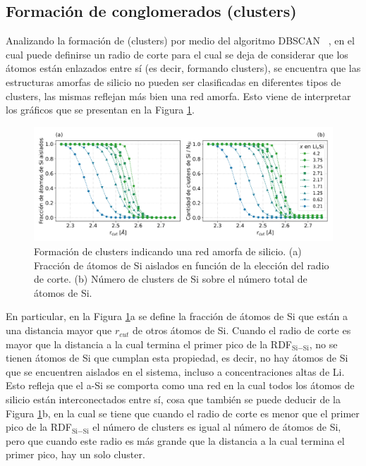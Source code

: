 \subsection{Formación de conglomerados (clusters)}\label{s:clusters}

Analizando la formación de  (clusters) por medio del algoritmo DBSCAN 
~\cite{ester1996}, en el cual puede definirse un radio de corte para el cual se 
deja de considerar que los átomos están enlazados entre sí (es decir, formando 
clusters), se encuentra que las estructuras amorfas de silicio no pueden ser 
clasificadas en diferentes tipos de clusters, las mismas reflejan más bien 
una red amorfa. Esto viene de interpretar los gráficos que se presentan en la 
Figura \ref{fig:clusters}. 
\begin{figure}[h!]
    \centering
    \includegraphics[width=\textwidth]{Silicio/caracterizacion/resultados/clusters/clusters.png}
    \caption{Formación de clusters indicando una red amorfa de silicio. (a) 
    Fracción de átomos de Si aislados en función de la elección del
    radio de corte. (b) Número de clusters de Si sobre el número total de átomos 
    de Si.}
    \label{fig:clusters}
\end{figure}

En particular, en la Figura \ref{fig:clusters}a se define la fracción 
de átomos de Si que están a una distancia mayor que $r_{cut}$ de otros átomos de 
Si. Cuando el radio de corte es mayor que la distancia a la cual termina el 
primer pico de la RDF$_{\text{Si}-\text{Si}}$, no se tienen átomos de Si que cumplan esta 
propiedad, es decir, no hay átomos de Si que se encuentren aislados en el sistema,
incluso a concentraciones altas de Li. Esto refleja que el a-Si se comporta como 
una red en la cual todos los átomos de silicio están interconectados entre sí, 
cosa que también se puede deducir de la Figura \ref{fig:clusters}b, en la cual 
se tiene que cuando el radio de corte es menor que el primer pico de la RDF$_{\text{Si}-\text{Si}}$ 
el número de clusters es igual al número de átomos de Si, pero que cuando este 
radio es más grande que la distancia a la cual termina el primer pico, hay un 
solo cluster.

